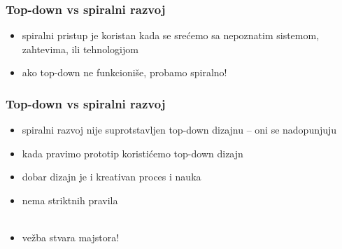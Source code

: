 \documentclass[utf8,compress,aspectratio=169]{beamer}
\begin{document}
\begin{frame}
  \frametitle{Top-down vs spiralni razvoj}
\begin{itemize}
  \item spiralni pristup je koristan kada se srećemo sa nepoznatim sistemom, zahtevima, ili tehnologijom
  \item ako top-down ne funkcioniše, probamo spiralno!
\end{itemize}
\end{frame}

\begin{frame}
  \frametitle{Top-down vs spiralni razvoj}
\begin{itemize}
  \item spiralni razvoj nije suprotstavljen top-down dizajnu -- oni se nadopunjuju
  \item kada pravimo prototip koristićemo top-down dizajn
  \item dobar dizajn je i kreativan proces i nauka
  \item nema striktnih pravila \\ \ \\
  \item vežba stvara majstora!
\end{itemize}
\end{frame}
\end{document}
